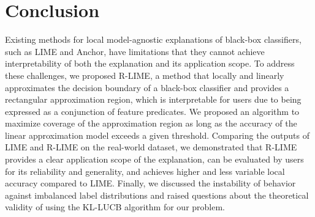 \documentclass[runningheads]{llncs}
\begin{document}
\section{Conclusion}
Existing methods for
local model-agnostic explanations of black-box classifiers,
such as LIME and Anchor,
have limitations that they cannot achieve interpretability of
both the explanation and its application scope.
To address these challenges,
we proposed R-LIME,
a method that locally and linearly approximates the decision boundary
of a black-box classifier and provides a rectangular approximation region,
which is interpretable for users due to being expressed as a conjunction of feature predicates.
We proposed an algorithm to
maximize coverage of the approximation region
as long as the accuracy of the linear approximation model exceeds a given threshold.
Comparing the outputs of LIME and R-LIME on the real-world dataset,
we demonstrated that R-LIME provides a clear application scope of the
explanation, can be evaluated by users for its reliability and generality,
and achieves higher and less variable local accuracy compared to LIME\@.
Finally, we discussed the instability of behavior against imbalanced label
distributions and raised questions about the theoretical validity of using
the KL-LUCB algorithm for our problem.



\end{document}
